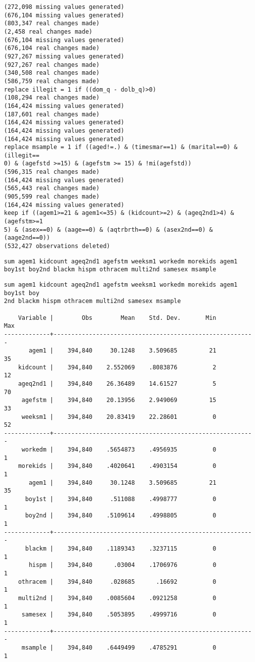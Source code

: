 \documentclass[11pt]{article}
\begin{document}
\begin{verbatim}
(272,098 missing values generated)
(676,104 missing values generated)
(803,347 real changes made)
(2,458 real changes made)
(676,104 missing values generated)
(676,104 real changes made)
(927,267 missing values generated)
(927,267 real changes made)
(340,508 real changes made)
(586,759 real changes made)
replace illegit = 1 if ((dom_q - dolb_q)>0)
(108,294 real changes made)
(164,424 missing values generated)
(187,601 real changes made)
(164,424 missing values generated)
(164,424 missing values generated)
(164,424 missing values generated)
replace msample = 1 if ((aged!=.) & (timesmar==1) & (marital==0) & (illegit==
0) & (agefstd >=15) & (agefstm >= 15) & !mi(agefstd))
(596,315 real changes made)
(164,424 missing values generated)
(565,443 real changes made)
(905,599 real changes made)
(164,424 missing values generated)
keep if ((agem1>=21 & agem1<=35) & (kidcount>=2) & (ageq2nd1>4) & (agefstm>=1
5) & (asex==0) & (aage==0) & (aqtrbrth==0) & (asex2nd==0) & (aage2nd==0))
(532,427 observations deleted)
\end{verbatim}

\begin{verbatim}
sum agem1 kidcount ageq2nd1 agefstm weeksm1 workedm morekids agem1 boy1st boy2nd blackm hispm othracem multi2nd samesex msample
\end{verbatim}

\begin{verbatim}
sum agem1 kidcount ageq2nd1 agefstm weeksm1 workedm morekids agem1 boy1st boy
2nd blackm hispm othracem multi2nd samesex msample

    Variable |        Obs        Mean    Std. Dev.       Min        Max
-------------+---------------------------------------------------------
       agem1 |    394,840     30.1248    3.509685         21         35
    kidcount |    394,840    2.552069    .8083876          2         12
    ageq2nd1 |    394,840    26.36489    14.61527          5         70
     agefstm |    394,840    20.13956    2.949069         15         33
     weeksm1 |    394,840    20.83419    22.28601          0         52
-------------+---------------------------------------------------------
     workedm |    394,840    .5654873    .4956935          0          1
    morekids |    394,840    .4020641    .4903154          0          1
       agem1 |    394,840     30.1248    3.509685         21         35
      boy1st |    394,840     .511088    .4998777          0          1
      boy2nd |    394,840    .5109614    .4998805          0          1
-------------+---------------------------------------------------------
      blackm |    394,840    .1189343    .3237115          0          1
       hispm |    394,840      .03004    .1706976          0          1
    othracem |    394,840     .028685      .16692          0          1
    multi2nd |    394,840    .0085604    .0921258          0          1
     samesex |    394,840    .5053895    .4999716          0          1
-------------+---------------------------------------------------------
     msample |    394,840    .6449499    .4785291          0          1
\end{verbatim}
\end{document}
